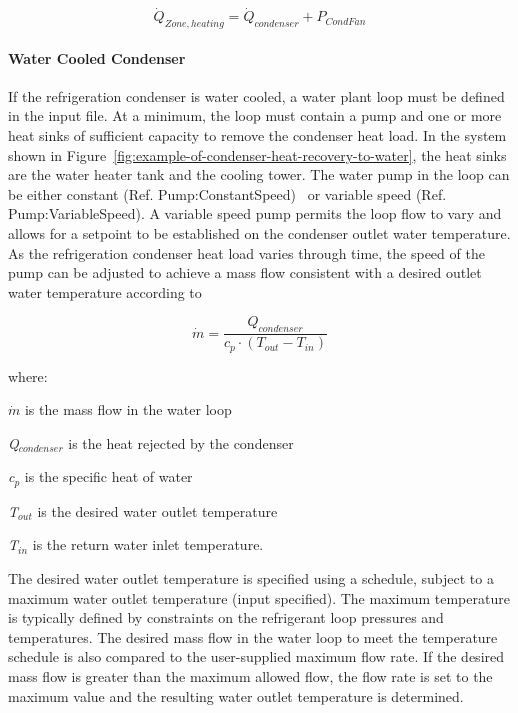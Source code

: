 \begin{equation}
{\dot Q_{Zone,heating}} = {\dot Q_{condenser}} + {P_{CondFan}}
\end{equation}

\paragraph{Water Cooled Condenser}\label{water-cooled-condenser}

If the refrigeration condenser is water cooled, a water plant loop must be defined in the input file. At a minimum, the loop must contain a pump and one or more heat sinks of sufficient capacity to remove the condenser heat load. In the system shown in Figure~\ref{fig:example-of-condenser-heat-recovery-to-water}, the heat sinks are the water heater tank and the cooling tower. The water pump in the loop can be either constant (Ref. Pump:ConstantSpeed)~ or variable speed (Ref. Pump:VariableSpeed). A variable speed pump permits the loop flow to vary and allows for a setpoint to be established on the condenser outlet water temperature. As the refrigeration condenser heat load varies through time, the speed of the pump can be adjusted to achieve a mass flow consistent with a desired outlet water temperature according to

\begin{equation}
\dot{m} = \frac{{{Q_{condenser}}}}{{{c_p} \cdot ({T_{out}} - {T_{in}})}}
\end{equation}

where:

\emph{\(\dot{m}\)} is the mass flow in the water loop

\emph{Q\(_{condenser}\)} is the heat rejected by the condenser

\emph{c\(_{p}\)} is the specific heat of water

\emph{T\(_{out}\)} is the desired water outlet temperature

\emph{T\(_{in}\)} is the return water inlet temperature.

The desired water outlet temperature is specified using a schedule, subject to a maximum water outlet temperature (input specified). The maximum temperature is typically defined by constraints on the refrigerant loop pressures and temperatures. The desired mass flow in the water loop to meet the temperature schedule is also compared to the user-supplied maximum flow rate. If the desired mass flow is greater than the maximum allowed flow, the flow rate is set to the maximum value and the resulting water outlet temperature is determined.

